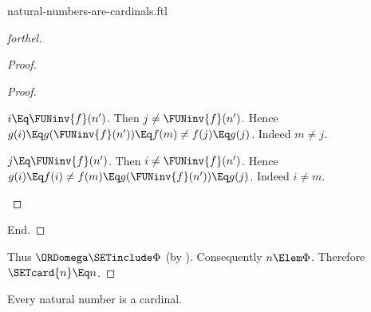 \documentclass{stex}
\begin{document}
\begin{smodule}{natural-numbers-are-cardinals.ftl}
\begin{proof}[forthel]
\begin{proof}
\begin{proof}
        \begin{case}{$i \Eq \FUNinv{f}(n')$.}
          Then $j \neq \FUNinv{f}(n')$.
          Hence $g(i)
            \Eq g(\FUNinv{f}(n'))
            \Eq f(m)
            \neq f(j)
            \Eq g(j)$.
          Indeed $m \neq j$.
        \end{case}

        \begin{case}{$j \Eq \FUNinv{f}(n')$.}
          Then $i \neq \FUNinv{f}(n')$.
          Hence $g(i)
            \Eq f(i)
            \neq f(m)
            \Eq g(\FUNinv{f}(n'))
            \Eq g(j)$.
          Indeed $i \neq m$.
        \end{case}
      \end{proof}
    End.
  \end{proof}

  Thus $\ORDomega \SETinclude \Phi$ (by ).
  Consequently $n \Elem \Phi$.
  Therefore $\SETcard{n} \Eq n$.
\end{proof}

\begin{corollary}[forthel,id=SET_THEORY_07_7061392098066432]
  Every natural number is a cardinal.
\end{corollary}
\end{smodule}
\end{document}
